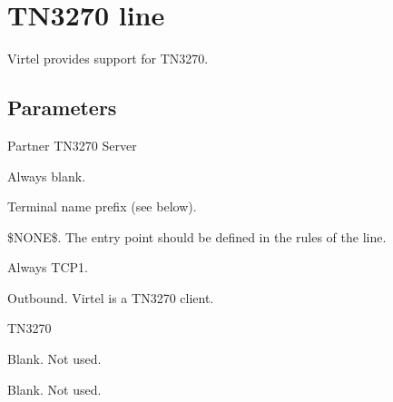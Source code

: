 \documentclass[letterpaper,10pt,english]{sphinxmanual}
\begin{document}
\ignorespaces 

\section{TN3270 line}
\label{\detokenize{connectivity_guide:tn3270-line}}\label{\detokenize{connectivity_guide:v462cn-virtelrules}}\label{\detokenize{connectivity_guide:index-90}}
\sphinxAtStartPar
Virtel provides support for TN3270.

\sphinxAtStartPar
{}

\ignorespaces 

\subsection{Parameters}
\label{\detokenize{connectivity_guide:index-91}}\label{\detokenize{connectivity_guide:id43}}\begin{description}
\sphinxAtStartPar
Partner TN3270 Server

\sphinxAtStartPar
Always blank.

\sphinxAtStartPar
Terminal name prefix (see below).

\sphinxAtStartPar
\$NONE\$. The entry point should be defined in the rules of the line.

\sphinxAtStartPar
Always TCP1.

\sphinxAtStartPar
Outbound. Virtel is a TN3270 client.

\sphinxAtStartPar
TN3270



\sphinxAtStartPar
Blank. Not used.

\sphinxAtStartPar
Blank. Not used.

\end{description}

\ignorespaces 
\end{document}
